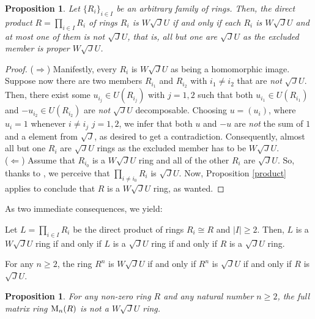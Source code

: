 \documentclass[12pt]{amsart}
\newtheorem{proposition}[theorem]{Proposition} \newtheorem{lemma}[theorem]{Lemma}
\begin{document}
\begin{proposition}\label{productt} Let $\{R_i\}_{i \in I}$ be an arbitrary family of rings. Then, the direct product $R=\prod_{i \in I} R_i$ of rings $R_i$ is $W\sqrt{J}U$ if and only if each $R_i$ is $W\sqrt{J}U$ and at most one of them is {\it not} $\sqrt{J}U$, that is, all but one are $\sqrt{J}U$ as the excluded member is proper $W\sqrt{J}U$.
\end{proposition}

\begin{proof} ($\Rightarrow$) Manifestly, every $R_i$ is $W\sqrt{J}U$ as being a homomorphic image. Suppose now there are two members $R_{i_1}$ and $R_{i_2}$ with $i_1 \neq i_2$ that are {\it not} $\sqrt{J}U$. Then, there exist some $u_{i_j} \in U (R_{i_j})$ with $j=1,2$ such that both $u_{i_1} \in U (R_{i_1})$ and $-u_{i_2} \in U (R_{i_2})$ are {\it not} $\sqrt{J}U$ decomposable. Choosing $u=(u_i)$, where $u_i=1$ whenever $i \neq i_{j}$ $j=1,2$, we infer that both $u$ and $-u$ are {\it not} the sum of $1$ and a element from $\sqrt{J}$, as desired to get a contradiction. Consequently, almost all but one $R_i$ are $\sqrt{J}U$ rings as the excluded member has to be $W\sqrt{J}U$.\\ ($\Leftarrow$) Assume that $R_{i_0}$ is a $W\sqrt{J}U$ ring and all of the other $R_i$ are $\sqrt{J}U$. So, thanks to \cite[Proposition 2.4]{SU}, we perceive that $\prod_{i \neq i_{0}} R_i$ is $\sqrt{J}U$. Now, Proposition \ref{product} applies to conclude that $R$ is a $W\sqrt{J}U$ ring, as wanted.
\end{proof}

As two immediate consequences, we yield:

\begin{corollary}\label{pro1} Let $L=\prod_{i \in I} R_i$ be the direct product of rings $R_i \cong R$ and $|I|
\geq 2$. Then, $L$ is a $W\sqrt{J}U$ ring if and only if $L$ is a $\sqrt{J}U$ ring if and only if $R$ is a
$\sqrt{J}U$ ring.
\end{corollary}

\begin{corollary}\label{10} For any $n \geq 2$, the ring $R^n$ is $W\sqrt{J}U$ if and only if $R^n$ is
$\sqrt{J}U$ if and only if $R$ is $\sqrt{J}U$.
\end{corollary}

\begin{proposition}\label{matrix} For any non-zero ring \( R \) and any natural number \( n \geq 2 \), the full
matrix ring \( {\rm M}_n(R) \) is not a $W\sqrt{J}U$ ring.
\end{proposition}
\end{document}
